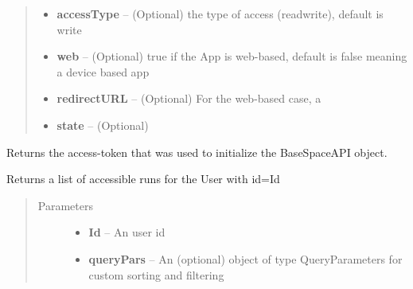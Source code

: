 \documentclass[letterpaper,10pt,english]{sphinxmanual}
\begin{document}
\begin{fulllineitems}
\begin{fulllineitems}
\begin{quote}
\begin{description}
\begin{itemize}
\item {} 
\textbf{accessType} -- (Optional) the type of access (read\textbar{}write), default is write

\item {} 
\textbf{web} -- (Optional) true if the App is web-based, default is false meaning a device based app

\item {} 
\textbf{redirectURL} -- (Optional) For the web-based case, a

\item {} 
\textbf{state} -- (Optional)

\end{itemize}

\end{description}\end{quote}

\end{fulllineitems}


\begin{fulllineitems}
\label{Available modules:BaseSpacePy.api.BaseSpaceAPI.BaseSpaceAPI.getAccessToken}
Returns the access-token that was used to initialize the BaseSpaceAPI object.

\end{fulllineitems}


\begin{fulllineitems}
\label{Available modules:BaseSpacePy.api.BaseSpaceAPI.BaseSpaceAPI.getAccessibleRunsByUser}
Returns a list of accessible runs for the User with id=Id
\begin{quote}\begin{description}
\item[{Parameters}] \leavevmode\begin{itemize}
\item {} 
\textbf{Id} -- An user id

\item {} 
\textbf{queryPars} -- An (optional) object of type QueryParameters for custom sorting and filtering


\end{itemize}
\end{description}
\end{quote}
\end{fulllineitems}
\end{fulllineitems}
\end{document}
